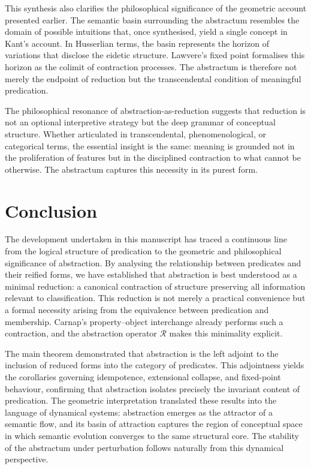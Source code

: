\documentclass[12pt,letterpaper]{article}
\begin{document}
This synthesis also clarifies the philosophical significance of the geometric account presented earlier. The semantic basin surrounding the abstractum resembles the domain of possible intuitions that, once synthesised, yield a single concept in Kant’s account. In Husserlian terms, the basin represents the horizon of variations that disclose the eidetic structure. Lawvere’s fixed point formalises this horizon as the colimit of contraction processes. The abstractum is therefore not merely the endpoint of reduction but the transcendental condition of meaningful predication.

The philosophical resonance of abstraction-as-reduction suggests that reduction is not an optional interpretive strategy but the deep grammar of conceptual structure. Whether articulated in transcendental, phenomenological, or categorical terms, the essential insight is the same: meaning is grounded not in the proliferation of features but in the disciplined contraction to what cannot be otherwise. The abstractum captures this necessity in its purest form.

\section{Conclusion}

The development undertaken in this manuscript has traced a continuous line from the logical structure of predication to the geometric and philosophical significance of abstraction. By analysing the relationship between predicates and their reified forms, we have established that abstraction is best understood as a minimal reduction: a canonical contraction of structure preserving all information relevant to classification. This reduction is not merely a practical convenience but a formal necessity arising from the equivalence between predication and membership. Carnap’s property–object interchange already performs such a contraction, and the abstraction operator $\mathcal{R}$ makes this minimality explicit.

The main theorem demonstrated that abstraction is the left adjoint to the inclusion of reduced forms into the category of predicates. This adjointness yields the corollaries governing idempotence, extensional collapse, and fixed-point behaviour, confirming that abstraction isolates precisely the invariant content of predication. The geometric interpretation translated these results into the language of dynamical systems: abstraction emerges as the attractor of a semantic flow, and its basin of attraction captures the region of conceptual space in which semantic evolution converges to the same structural core. The stability of the abstractum under perturbation follows naturally from this dynamical perspective.
\end{document}
